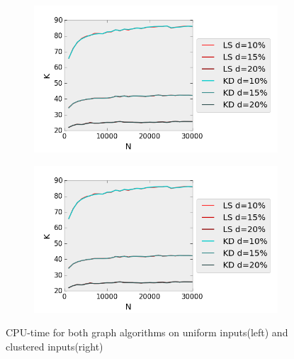 \begin{figure}[H] 
  \begin{subfigure}[b]{0.5\linewidth}
    \centering
    \includegraphics[width=0.9\linewidth]{Pictures/unif_kd_ls_k} 
    \label{fig:unif_kd_ls_k} 
    \vspace{4ex}
  \end{subfigure}%
  \begin{subfigure}[b]{0.5\linewidth}
    \centering
    \includegraphics[width=0.9\linewidth]{Pictures/unif_kd_ls_k} 
    \label{fig:clus_kd_ls_k} 
    \vspace{4ex}
  \end{subfigure}
  \caption{CPU-time for both graph algorithms on uniform inputs(left) and clustered inputs(right)}
  \label{fig:kd_ls_k} 
\end{figure}

